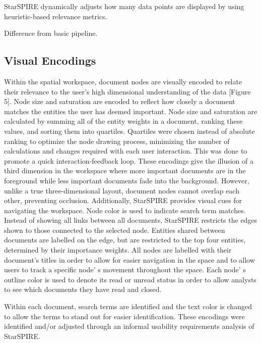 \documentclass[journal]{vgtc}                %
\begin{document}
StarSPIRE dynamically adjusts how many data points are displayed by using heuristic-based relevance metrics.

Difference from basic pipeline.

\subsection{Visual Encodings}
Within the spatial workspace, document nodes are visually encoded to relate their relevance to the user’s high dimensional understanding of the data [Figure 5].
Node size and saturation are encoded to reflect how closely a document matches the entities the user has deemed important.
Node size and saturation are calculated by summing all of the entity weights in a document, ranking these values, and sorting them into quartiles.
Quartiles were chosen instead of absolute
ranking to optimize the node drawing process, minimizing the number of calculations and changes required with each user interaction.
This was done to promote a quick interaction-feedback loop.
These encodings give the illusion of a third dimension in the workspace where more important documents are in the foreground while less important documents fade into the background.
However, unlike a true three-dimensional layout, document nodes cannot overlap each other, preventing occlusion.
Additionally, StarSPIRE provides visual cues for navigating the workspace.
Node color is used to indicate search term matches.
Instead of showing all links between all documents, StarSPIRE restricts the edges shown to those connected to the selected node.
Entities shared between documents are labelled on the edge, but are restricted to the top four entities, determined by their importance weights.
All nodes are labelled with their document’s titles in order to allow for easier navigation in the space and to allow users to track a specific node’ s movement throughout the space.
Each node’ s outline color is used to denote its read or unread status in order to allow analysts to see which documents they have read and closed.

Within each document, search terms are identified and the text color is changed to allow the terms to stand out for easier identification.
These encodings were identified and/or adjusted through an informal usability requirements analysis of StarSPIRE.

\end{document}
